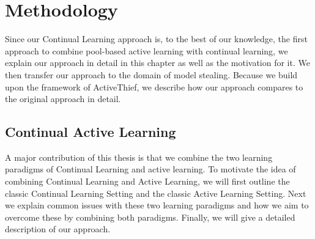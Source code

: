 
\chapter{Methodology}
\label{ch:Methodolody}

Since our Continual Learning approach is, to the best of our knowledge, the first approach to combine pool-based active learning with continual
learning, we explain our approach in detail in this chapter as well as the motivation for it. We then transfer our approach to the domain of model
stealing. Because we build upon the framework of ActiveThief, we describe how our approach compares to the original approach in detail.

\section{Continual Active Learning}
\label{sec:Methodology:ContinualActiveLearning}
A major contribution of this thesis is that we combine the two learning paradigms of Continual Learning and active learning. To motivate the idea of
combining Continual Learning and Active Learning, we will first outline the classic Continual Learning Setting and the classic Active Learning Setting.
Next we explain common issues with these two learning paradigms and how we aim to overcome these by combining both paradigms. Finally, we will give
a detailed description of our approach. 


